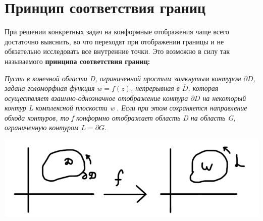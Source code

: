 \documentclass[a4paper, 12pt]{report}
\begin{document}
\section{Принцип соответствия границ}
При решении конкретных задач на конформные отображения чаще всего достаточно выяснить, во что переходят при отображении границы и не обязательно исследовать все внутренние точки. Это возможно в силу так называемого \textbf{принципа соответствия границ:}
\quad\bigskip

\textit{Пусть в конечной области D, ограниченной простым замкнутым контуром $\partial D$, задана голоморфная функция $w=f(z)$, непрерывная в $\overline{D}$, которая осуществляет взаимно-однозначное отображение контура $\partial D$ на некоторый  контур L комплексной плоскости \textcircled{w}. Если при этом сохраняется направление обхода контуров, то f конформно отображает область D на область G, ограниченную контуром $L=\partial G$.}
\par
\begin{center}
    \includegraphics[width=8 cm]{borders.png}
\end{center}
\end{document}
